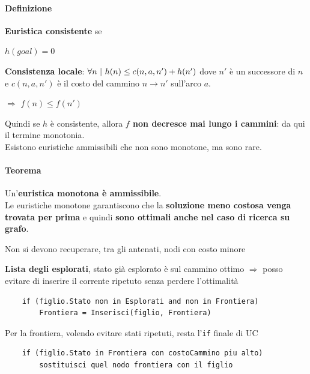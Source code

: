 \documentclass[10pt]{book}
\begin{document}
\paragraph{Definizione} \textbf{Euristica consistente} se
\begin{list}{}{}
	\item $h(goal) = 0$
	\item \textbf{Consistenza locale}: $\forall n\:\:\vline\:\:h(n) \leq c(n, a, n') + h(n')$ dove $n'$ è un successore di $n$ e $c(n, a, n')$ è il costo del cammino $n\rightarrow n'$ sull'arco $a$.
	\item $\Rightarrow$ $f(n) \leq f(n')$
\end{list}
Quindi se $h$ è consistente, allora \textbf{$f$ non decresce mai lungo i cammini}: da qui il termine monotonia.\\
Esistono euristiche ammissibili che non sono monotone, ma sono rare.
\paragraph{Teorema} Un'\textbf{euristica monotona è ammissibile}.\\
Le euristiche monotone garantiscono che la \textbf{soluzione meno costosa venga trovata per prima} e quindi \textbf{sono ottimali anche nel caso di ricerca su grafo}.
\begin{list}{}{}
	\item Non si devono recuperare, tra gli antenati, nodi con costo minore
	\item \textbf{Lista degli esplorati}, stato già esplorato è sul cammino ottimo $\Rightarrow$ posso evitare di inserire il corrente ripetuto senza perdere l'ottimalità
	\begin{lstlisting}
	if (figlio.Stato non in Esplorati and non in Frontiera)
		Frontiera = Inserisci(figlio, Frontiera)
	\end{lstlisting}
	\item Per la frontiera, volendo evitare stati ripetuti, resta l'\texttt{if} finale di UC
	\begin{lstlisting}
	if (figlio.Stato in Frontiera con costoCammino piu alto)
		sostituisci quel nodo frontiera con il figlio
	\end{lstlisting}
\end{list}
\end{document}
